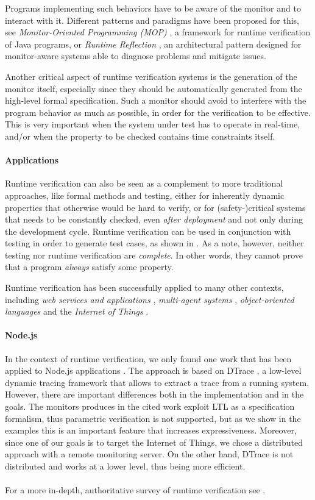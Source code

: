 Programs implementing such behaviors have to be aware of the monitor and to interact with it.
Different patterns and paradigms have been proposed for this, see \emph{Monitor-Oriented Programming (MOP)} \cite{mop}, a framework for runtime verification of Java programs, or \emph{Runtime Reflection} \cite{rr}, an architectural pattern designed for monitor-aware systems able to diagnose problems and mitigate issues.

Another critical aspect of runtime verification systems is the generation of the monitor itself, especially since they should be automatically generated from the high-level formal specification.
Such a monitor should avoid to interfere with the program behavior as much as possible, in order for the verification to be effective.
This is very important when the system under test has to operate in real-time, and/or when the property to be checked contains time constraints itself.

\paragraph{Applications}
Runtime verification can also be seen as a complement to more traditional approaches, like formal methods and testing, either for inherently dynamic properties that otherwise would be hard to verify, or for (safety-)critical systems that needs to be constantly checked, even \emph{after deployment} and not only during the development cycle.
Runtime verification can be used in conjunction with testing in order to generate test cases, as shown in \cite{artho2005combining}.
As a note, however, neither testing nor runtime verification are \emph{complete}.
In other words, they cannot prove that a program \emph{always} satisfy some property.

Runtime verification has been successfully applied to many other contexts, including \emph{web services and applications} \cite{webservices, webapps}, \emph{multi-agent systems} \cite{AnconaDM12}, \emph{object-oriented languages} \cite{pql, javadynamic, de2014combining, BoerEtAl14} and the \emph{Internet of Things} \cite{rviot1, rviot2}.

\paragraph{Node.js}
In the context of runtime verification, we only found one work that has been applied to Node.js applications \cite{Rosenberg2016}.
The approach is based on DTrace \cite{dtrace}, a low-level dynamic tracing framework that allows to extract a trace from a running system.
However, there are important differences both in the implementation and in the goals.
The monitors produces in the cited work exploit LTL \cite{ltl} as a specification formalism, thus parametric verification is not supported, but as we show in the examples this is an important feature that increases expressiveness.
Moreover, since one of our goals is to target the Internet of Things, we chose a distributed approach with a remote monitoring server.
On the other hand, DTrace is not distributed and works at a lower level, thus being more efficient.

\paragraph*{}
For a more in-depth, authoritative survey of runtime verification see \cite{rv}.
